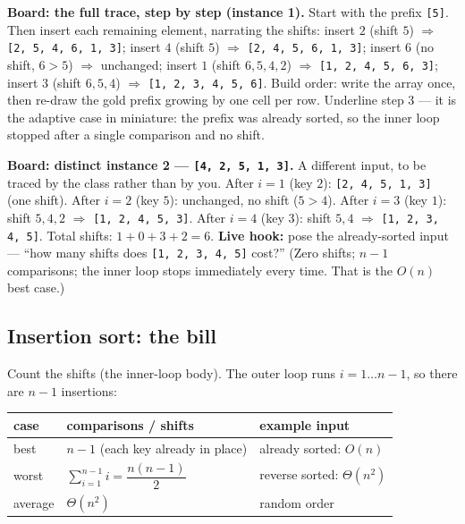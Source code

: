 \documentclass[11pt]{article}
\begin{document}
\textbf{Board: the full trace, step by step (instance 1).} Start with the prefix \texttt{[5]}. Then insert each remaining element, narrating the shifts: insert $2$ (shift $5$) $\Rightarrow$ \texttt{[2, 5, 4, 6, 1, 3]}; insert $4$ (shift $5$) $\Rightarrow$ \texttt{[2, 4, 5, 6, 1, 3]}; insert $6$ (no shift, $6 > 5$) $\Rightarrow$ unchanged; insert $1$ (shift $6,5,4,2$) $\Rightarrow$ \texttt{[1, 2, 4, 5, 6, 3]}; insert $3$ (shift $6,5,4$) $\Rightarrow$ \texttt{[1, 2, 3, 4, 5, 6]}. Build order: write the array once, then re-draw the gold prefix growing by one cell per row. Underline step 3 --- it is the adaptive case in miniature: the prefix was already sorted, so the inner loop stopped after a single comparison and no shift.

\textbf{Board: distinct instance 2 --- \texttt{[4, 2, 5, 1, 3]}.} A different input, to be traced by the class rather than by you. After $i=1$ (key $2$): \texttt{[2, 4, 5, 1, 3]} (one shift). After $i=2$ (key $5$): unchanged, no shift ($5 > 4$). After $i=3$ (key $1$): shift $5,4,2$ $\Rightarrow$ \texttt{[1, 2, 4, 5, 3]}. After $i=4$ (key $3$): shift $5,4$ $\Rightarrow$ \texttt{[1, 2, 3, 4, 5]}. Total shifts: $1 + 0 + 3 + 2 = 6$. \textbf{Live hook:} pose the already-sorted input --- ``how many shifts does \texttt{[1, 2, 3, 4, 5]} cost?'' (Zero shifts; $n-1$ comparisons; the inner loop stops immediately every time. That is the $O(n)$ best case.)

\subsection{Insertion sort: the bill}

Count the shifts (the inner-loop body). The outer loop runs $i = 1 \dots n-1$, so there are $n-1$ insertions:

\begin{center}
{\footnotesize
\begin{tabular}{lll}
  \toprule
  \textbf{case} & \textbf{comparisons / shifts} & \textbf{example input} \\
  \midrule
  best & $n-1$ (each key already in place) & already sorted: $O(n)$ \\
  worst & $\sum_{i=1}^{n-1} i = \dfrac{n(n-1)}{2}$ & reverse sorted: $\Theta(n^2)$ \\
  average & $\Theta(n^2)$ & random order \\
  \bottomrule
\end{tabular}}
\end{center}
\end{document}

